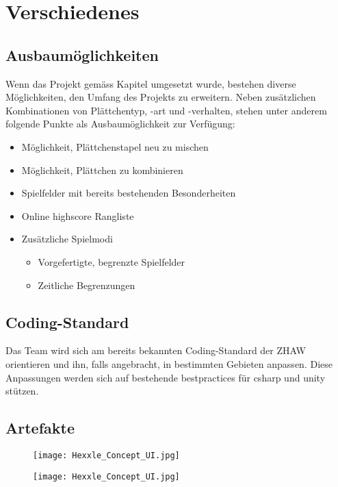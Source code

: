 \documentclass[../main.tex]{subfiles}
\begin{document}
	\section{Verschiedenes}
	
	\subsection{Ausbaumöglichkeiten}
	\par Wenn das Projekt gemäss Kapitel  umgesetzt wurde, bestehen diverse Möglichkeiten, den Umfang des Projekts zu erweitern. Neben zusätzlichen Kombinationen von Plättchentyp, -art und -verhalten, stehen unter anderem folgende Punkte als Ausbaumöglichkeit zur Verfügung:
	\begin{itemize}
		\item Möglichkeit, Plättchenstapel neu zu mischen
		\item Möglichkeit, Plättchen zu kombinieren
		\item Spielfelder mit bereits bestehenden Besonderheiten
		\item Online \gls{highscore} Rangliste
		\item Zusätzliche Spielmodi
		\begin{itemize}
			\item Vorgefertigte, begrenzte Spielfelder
			\item Zeitliche Begrenzungen
		\end{itemize}
	\end{itemize}
	\subsection{Coding-Standard}
	\par Das Team wird sich am bereits bekannten Coding-Standard der ZHAW orientieren und ihn, falls angebracht, in bestimmten Gebieten anpassen. Diese Anpassungen werden sich auf bestehende \glspl{bestpractice} für \gls{csharp} und \gls{unity} stützen.
	\subsection{Artefakte}
	
	\begin{figure}[H]
		\centering
		\texttt{[image: Hexxle\_Concept\_UI.jpg]}
		\caption{}
	\end{figure}

	\begin{figure}[H]
		\centering
		\texttt{[image: Hexxle\_Concept\_UI.jpg]}
		\caption{}
	\end{figure}
\end{document}
